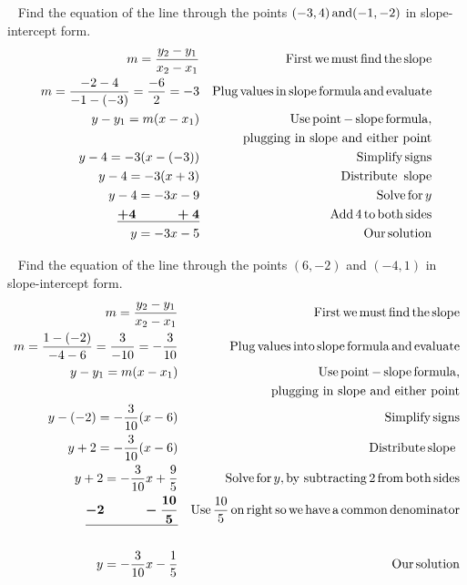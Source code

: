 \begin{example}\label{Lin66}
~\pp
   Find the equation of the line through the points $(- 3, 4) \operatorname{and} (- 1,
  - 2)$ in slope-intercept form.
  \begin{eqnarray*}
    m = \frac{y_2 - y_1}{x_2 - x_1} &  & \operatorname{First} \operatorname{we} \operatorname{must}
    \operatorname{find} \operatorname{the} \operatorname{slope}\\
    m = \frac{- 2 - 4}{- 1 - (- 3)} = \frac{- 6}{2} = - 3 &  & \operatorname{Plug}
    \operatorname{values} \operatorname{in} \operatorname{slope} \operatorname{formula} \operatorname{and}
    \operatorname{evaluate}\\
    y - y_1 = m (x - x_1) &  & \operatorname{Use} \operatorname{point} - \operatorname{slope} \operatorname{formula},\\
		& &  \operatorname{~~~plugging~in~slope~and~either~point}\\
    y - 4 = - 3 (x - (- 3)) &  & \operatorname{Simplify} \operatorname{signs}\\
    y - 4 = - 3 (x + 3) &  & \operatorname{Distribute~} \operatorname{slope}\\
    y - 4 = - 3 x - 9 &  & \operatorname{Solve} \operatorname{for} y \\
    \boldsymbol{\underline{+ 4 ~~~~~~~~~+ 4}} &  & \operatorname{Add} 4 \operatorname{to} \operatorname{both} \operatorname{sides}\\
    y = - 3 x - 5 &  & \operatorname{Our} \operatorname{solution}
  \end{eqnarray*}
\end{example}

\begin{example}\label{Lin67}
~\pp
   Find the equation of the line through the points $(6, - 2)$ and $(- 4, 1)$
  in slope-intercept form.
  \begin{eqnarray*}
    m = \frac{y_2 - y_1}{x_2 - x_1} &  & \operatorname{First} \operatorname{we} \operatorname{must}
    \operatorname{find} \operatorname{the} \operatorname{slope}\\
    m = \frac{1 - (- 2)}{- 4 - 6} = \frac{3}{- 10} = - \frac{3}{10} &  &
    \operatorname{Plug} \operatorname{values} \operatorname{into} \operatorname{slope} \operatorname{formula}
    \operatorname{and} \operatorname{evaluate}\\
    y - y_1 = m (x - x_1) &  & \operatorname{Use} \operatorname{point} - \operatorname{slope}
    \operatorname{formula},\\
		& &  \operatorname{~~~plugging~in~slope~and~either~point}\\
    y - (- 2) = - \frac{3}{10} (x - 6) &  & \operatorname{Simplify} \operatorname{signs}\\
    y + 2 = - \frac{3}{10} (x - 6) &  & \operatorname{Distribute} \operatorname{slope~}\\
    y + 2 = - \frac{3}{10} x + \frac{9}{5} &  & \operatorname{Solve} \operatorname{for} y,
    \operatorname{by~subtracting} 2 \operatorname{from} \operatorname{both} \operatorname{sides}\\
    \boldsymbol{\underline{- 2 ~~~~~~~~~- \frac{10}{5}}} &  & \operatorname{Use} \frac{10}{5} \operatorname{on}
    \operatorname{right} \operatorname{so} \operatorname{we} \operatorname{have} \operatorname{a} \operatorname{common}
    \operatorname{denominator}\\
    & & \\
		y = - \frac{3}{10} x - \frac{1}{5} &  & \operatorname{Our} \operatorname{solution}
  \end{eqnarray*}
\end{example}

